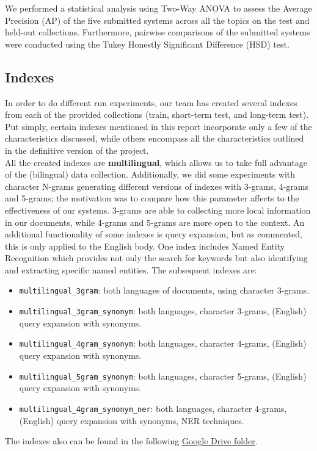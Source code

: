 We performed a statistical analysis using Two-Way ANOVA to assess the Average Precision (AP) of the five submitted
systems across all the topics on the test and held-out collections.
Furthermore, pairwise comparisons of the submitted systems were conducted using the Tukey Honestly Significant
Difference (HSD) test.

\subsection{Indexes}\label{subsec:indexes}

In order to do different run experiments, our team has created several indexes from each of the provided collections
(train, short-term test, and long-term test).
Put simply, certain indexes mentioned in this report incorporate only a few of the characteristics discussed, while
others encompass all the characteristics outlined in the definitive version of the project.\\

All the created indexes are \textbf{multilingual}, which allows us to take full advantage of the (bilingual) data
collection.
Additionally, we did some experiments with character N-grams generating different versions of indexes with 3-grams,
4-grams and 5-grams;
the motivation was to compare how this parameter affects to the effectiveness of our systems.
3-grams are able to collecting more local information in our documents, while 4-grams and 5-grams are more open to
the context.
An additional functionality of some indexes is query expansion, but as commented, this is only applied to the English
body.
One index includes Named Entity Recognition which provides not only the search for keywords but also identifying and
extracting specific named entities.
The subsequent indexes are:
\begin{itemize}
	\item \texttt{multilingual\_3gram}: both languages of documents, using character 3-grams.
	\item \texttt{multilingual\_3gram\_synonym}: both languages, character 3-grams, (English) query expansion with synonyms.
	\item \texttt{multilingual\_4gram\_synonym}: both languages, character 4-grams, (English) query expansion with synonyms.
	\item \texttt{multilingual\_5gram\_synonym}: both languages, character 5-grams, (English) query expansion with synonyms.
	\item \texttt{multilingual\_4gram\_synonym\_ner}: both languages, character 4-grams, (English) query expansion with synonyms, NER techniques.
\end{itemize}
The indexes also can be found in the following
\href{https://drive.google.com/drive/folders/1CK_kLeZ5Us3VJe8hiG1vhwPrDs94cLvU?usp=share_link}{Google Drive folder}.

